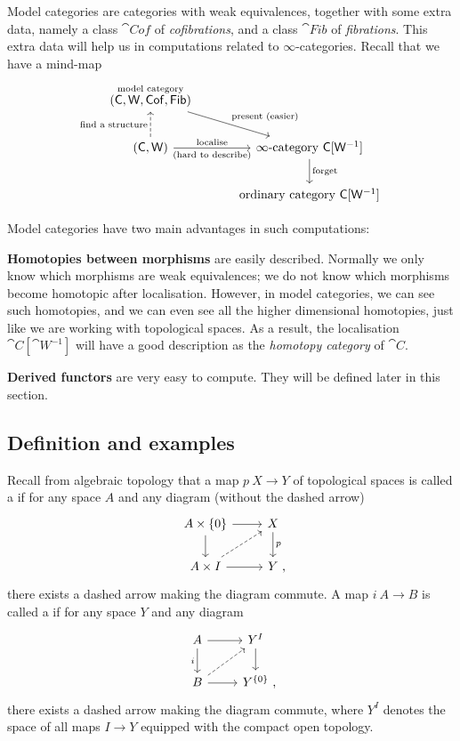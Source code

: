 Model categories are categories with weak equivalences,
together with some extra data, namely
a class $\cat{Cof}$ of \emph{cofibrations},
and a class $\cat{Fib}$ of \emph{fibrations}.
This extra data will help us in computations related to $∞$-categories. 
Recall that we have a mind-map
\[ \begin{tikzcd}[column sep=3em,row sep=2em]
    \overset{\text{model category}}{(\cat C,\cat W,\cat{Cof},\cat{Fib})} \ar[dr,"\text{present }(\text{easier})"] \\
    (\cat C,\cat W) \ar[u,dashed,"\text{find a structure}"] \ar[r,"\text{localise}","(\text{hard to describe})"']
    & \infty\text{-category }\cat C[\cat W^{-1}] \ar[d,"\text{forget}"] \\
    & \text{ordinary category }\cat C[\cat W^{-1}]
\end{tikzcd} \]

Model categories have two main advantages in such computations:
\begin{itms}
    \item \textbf{Homotopies between morphisms} are easily described.
    Normally we only know which morphisms are weak equivalences;
    we do not know which morphisms become homotopic after localisation.
    However, in model categories, we can see such homotopies,
    and we can even see all the higher dimensional homotopies,
    just like we are working with topological spaces.
    As a result, the localisation $\cat C[\cat W^{-1}]$
    will have a good description as the \emph{homotopy category} of $\cat C$.
    \item \textbf{Derived functors} are very easy to compute.
    They will be defined later in this section.
\end{itms}

\subsection{Definition and examples}

Recall from algebraic topology
that a map $p\:X\to Y$ of topological spaces is called a 
if for any space $A$ and any diagram (without the dashed arrow)
\[ \begin{tikzcd}
    A\times\{0\}\ar[r]\ar[d] & X\ar[d,"p"] \\
    A\times I\ar[r]\ar[ur,dashed] & Y\rlap{\ ,}
\end{tikzcd} \]
there exists a dashed arrow making the diagram commute.
A map $i\:A\to B$ is called a 
if for any space $Y$ and any diagram
\[ \begin{tikzcd}
    A\ar[r]\ar[d,"i"'] & Y^I\ar[d] \\
    B\ar[r]\ar[ur,dashed] & Y^{\{0\}}\rlap{\ ,}
\end{tikzcd} \]
there exists a dashed arrow making the diagram commute,
where $Y^I$ denotes the space of all maps $I\to Y$
equipped with the compact open topology.


